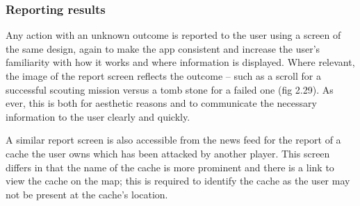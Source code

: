 \subsubsection{Reporting results}

Any action with an unknown outcome is reported to the user using a screen of the same design, again to make the app consistent and increase the user’s familiarity with how it works and where information is displayed. Where relevant, the image of the report screen reflects the outcome – such as a scroll for a successful scouting mission versus a tomb stone for a failed one (fig 2.29). As ever, this is both for aesthetic reasons and to communicate the necessary information to the user clearly and quickly.

A similar report screen is also accessible from the news feed for the report of a cache the user owns which has been attacked by another player. This screen differs in that the name of the cache is more prominent and there is a link to view the cache on the map; this is required to identify the cache as the user may not be present at the cache’s location.


